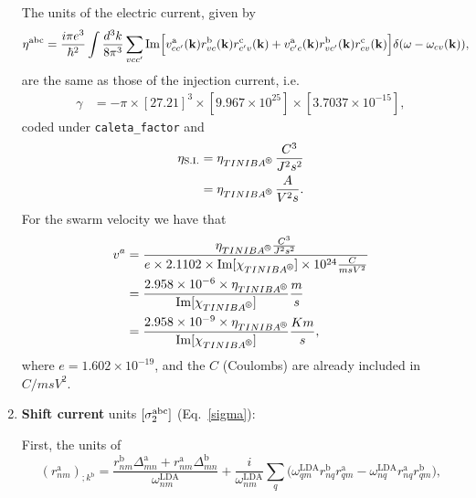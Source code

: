 \documentclass[12pt]{article}
\numberwithin{equation}{section}
\begin{document}
\begin{enumerate}
The units of the electric current, given by
\begin{align}\label{ec.3}
\eta^{\mathrm{a}\mathrm{b}\mathrm{c}} 
&=
\frac{i\pi e^3}{\hbar^2}
\int\frac{d^3k}{8\pi^3}
\sum_{vcc'}
\mathrm{Im}\Big[ 
v^{\mathrm{a}}_{cc'}(\mathbf{k}) r^{\mathrm{b}}_{vc}(\mathbf{k}) r^{\mathrm{c}}_{c'v}(\mathbf{k}) 
+
v^{\mathrm{a}}_{c'c}(\mathbf{k}) r^{\mathrm{b}}_{vc'}(\mathbf{k}) r^{\mathrm{c}}_{cv}(\mathbf{k}) 
\Big]
\delta(\omega-\omega_{cv}(\mathbf{k})) 
,
\end{align}
are the same as those of the injection current, i.e.
\begin{align}\label{gam_eta_ec}
\gamma 
 & =
-\pi 
\times 
[27.21]^3 
\times 
[9.967\times 10^{25}]
\times[3.7037\times 10^{-15}]
,
\end{align}
coded under \verb=caleta_factor=
and  
\begin{align}\label{u_eta_ec}
\eta_{\mathrm{S.I.}}
&=\eta_{\tiniba}\,
\frac{C^3}{J^2 s^2}
\nonumber\\
&=\eta_{\tiniba}\,
\frac{A}{V^2 s}
.  
\end{align} 
For the swarm velocity we have that
\begin{align}\label{sv.1}
v^a&=\frac{\eta_{\tiniba}
\frac{C^3}{J^2s^2}}
{e\times 2.1102\times\mathrm{Im}[\chi_{\tiniba}]
\times 10^{24}\frac{C}{msV^2}}
\nonumber\\
&=\frac{2.958\times 10^{-6}\times\eta_{\tiniba}}{\mathrm{Im}[\chi_{\tiniba}]}\frac{m}{s}
\nonumber\\
&=\frac{2.958\times 10^{-9}\times\eta_{\tiniba}}{\mathrm{Im}[\chi_{\tiniba}]}\frac{Km}{s}
,
\end{align}
where $e=1.602\times 10^{-19}$, and the $C$ (Coulombs) are already
included in $C/msV^2$.


\item {\bf Shift current} units $[\sigma^{\mathrm{a}\mathrm{b}\mathrm{c}}_2]$ (Eq.~\eqref{sigma}):

First, the units of 
\begin{equation}
(r^{\mathrm{a}}_{nm})_{;k^{\mathrm{b}}}
=
\frac{ 
r^{\mathrm{b}}_{nm}
\Delta^{\mathrm{a}}_{mn}
+r^{\mathrm{a}}_{nm}
\Delta^{\mathrm{b}}_{mn}
}
{\omega^\mathrm{LDA}_{nm}}
+
\frac{i}{\omega^\mathrm{LDA}_{nm}}
\sum_{q}
\bigg(
\omega^\mathrm{LDA}_{q m} 
r^{\mathrm{b}}_{nq} 
r^{\mathrm{a}}_{q m}
-
\omega^\mathrm{LDA}_{nq} 
r^{\mathrm{a}}_{nq} 
r^{\mathrm{b}}_{q m}
\bigg) 
,
\label{rka}
\end{equation} 


\end{enumerate}
\end{document}
